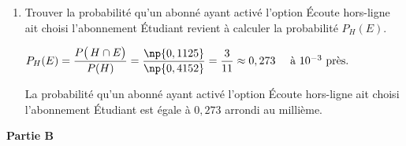 \begin{enumerate}
\quad $P(H) = P\big(\,E\cap H\big) + P\big(\,C\cap H\big) + P\big(\,F\cap H\big) $

D'où :\quad $\begin{aligned}[t] P(H)& = 0,1125 + P(C) \times P_C(H) +P\big(\,F\cap H\big) \\
			& = \np{0,1125} + 0,6 \times 0,3 + 0,12\\
			&= \np{0,1125} + 0,18 + 0,12\\
			& = \np{0,4125}
		\end{aligned} $

La probabilité qu'un abonné ait activé l'option \og Écoute hors-ligne\fg{} est bien de .
\item Trouver la probabilité qu'un abonné ayant activé l'option \og Écoute hors-ligne\fg{} ait choisi l'abonnement \og Étudiant\fg{} revient à calculer la probabilité $P_H(E)$.

$P_H(E)=\dfrac{P\big(\,H\cap E\big)}{P(H)}= \dfrac{\np{0,1125}}{\np{0,4152}} = \dfrac{3}{11} \approx 0,273 \quad\text{ à }10^{-3} \text{ près.}$

La probabilité qu'un abonné ayant activé l'option \og Écoute hors-ligne\fg{} ait choisi l'abonnement \og Étudiant\fg{} est égale à $0,273$ arrondi au millième.
\end{enumerate}

\textbf{Partie B}

